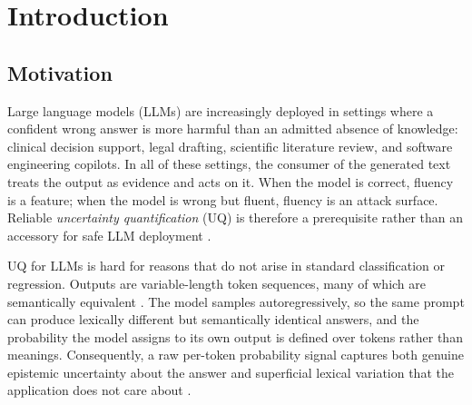 \documentclass[a4paper,oneside,10pt,ngerman,english]{scrbook}
\begin{document}

\mainmatter



\chapter{Introduction}
\label{ch:intro}
%

\section{Motivation}
\label{sec:motivation}
Large language models (LLMs) are increasingly deployed in settings where a
confident wrong answer is more harmful than an admitted absence of knowledge:
clinical decision support, legal drafting, scientific literature review, and
software engineering copilots. In all of these settings, the consumer of the
generated text treats the output as evidence and acts on it. When the model is
correct, fluency is a feature; when the model is wrong but fluent, fluency is
an attack surface. Reliable \emph{uncertainty quantification} (UQ) is therefore
a prerequisite rather than an accessory for safe LLM deployment
\cite{amodei2016concreteproblems,hendrycks2021unsolved,farquhar2024detecting}.

UQ for LLMs is hard for reasons that do not arise in standard classification
or regression. Outputs are variable-length token sequences, many of which are
semantically equivalent \cite{kuhn2023semantic}. The model samples
autoregressively, so the same prompt can produce lexically different but
semantically identical answers, and the probability the model assigns to its
own output is defined over tokens rather than meanings. Consequently, a raw
per-token probability signal captures both genuine epistemic uncertainty about
the answer and superficial lexical variation that the application does not
care about \cite{hullermeier2021aleatoric}.
\end{document}
